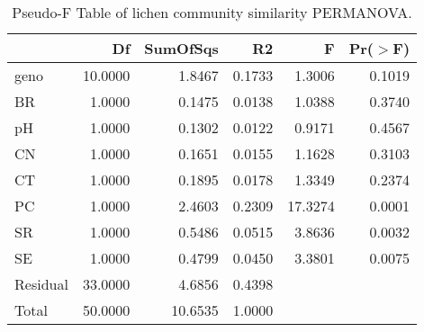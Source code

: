 \begin{table}[ht]
\centering
\begin{tabular}{lrrrrr}
  \hline
 & Df & SumOfSqs & R2 & F & Pr($>$F) \\ 
  \hline
geno & 10.0000 & 1.8467 & 0.1733 & 1.3006 & 0.1019 \\ 
  BR & 1.0000 & 0.1475 & 0.0138 & 1.0388 & 0.3740 \\ 
  pH & 1.0000 & 0.1302 & 0.0122 & 0.9171 & 0.4567 \\ 
  CN & 1.0000 & 0.1651 & 0.0155 & 1.1628 & 0.3103 \\ 
  CT & 1.0000 & 0.1895 & 0.0178 & 1.3349 & 0.2374 \\ 
  PC & 1.0000 & 2.4603 & 0.2309 & 17.3274 & 0.0001 \\ 
  SR & 1.0000 & 0.5486 & 0.0515 & 3.8636 & 0.0032 \\ 
  SE & 1.0000 & 0.4799 & 0.0450 & 3.3801 & 0.0075 \\ 
  Residual & 33.0000 & 4.6856 & 0.4398 &  &  \\ 
  Total & 50.0000 & 10.6535 & 1.0000 &  &  \\ 
   \hline
\end{tabular}
\caption{Pseudo-F Table of lichen community similarity PERMANOVA.} 
\label{tab:com_perm}
\end{table}
